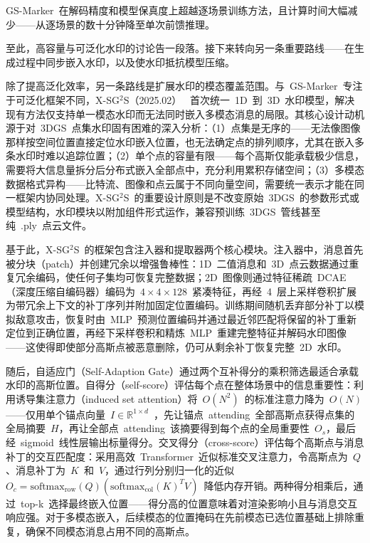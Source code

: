 GS-Marker~在解码精度和模型保真度上超越逐场景训练方法，且计算时间大幅减少——从逐场景的数十分钟降至单次前馈推理。

至此，高容量与可泛化水印的讨论告一段落。接下来转向另一条重要路线——在生成过程中同步嵌入水印，以及使水印抵抗模型压缩。

除了提高泛化效率，另一条路线是扩展水印的模态覆盖范围。与~GS-Marker~专注于可泛化框架不同，X-SG$^2$S（2025.02）~\cite{2502_10475} 首次统一~1D~到~3D~水印模型，解决现有方法仅支持单一模态水印而无法同时嵌入多模态消息的局限。其核心设计动机源于对~3DGS~点集水印固有困难的深入分析：（1）点集是无序的——无法像图像那样按空间位置直接定位水印嵌入位置，也无法确定点的排列顺序，尤其在嵌入多条水印时难以追踪位置；（2）单个点的容量有限——每个高斯仅能承载极少信息，需要将大信息量拆分后分布式嵌入全部点中，充分利用累积存储空间；（3）多模态数据格式异构——比特流、图像和点云属于不同向量空间，需要统一表示才能在同一框架内协同处理。X-SG$^2$S~的重要设计原则是不改变原始~3DGS~的参数形式或模型结构，水印模块以附加组件形式运作，兼容预训练~3DGS~管线甚至纯~.ply~点云文件。

基于此，X-SG$^2$S~的框架包含注入器和提取器两个核心模块。注入器中，消息首先被分块（patch）并创建冗余以增强鲁棒性：1D~二值消息和~3D~点云数据通过重复冗余编码，使任何子集均可恢复完整数据；2D~图像则通过特征稀疏~DCAE（深度压缩自编码器）编码为~$4 \times 4 \times 128$~紧凑特征，再经~4~层上采样卷积扩展为带冗余上下文的补丁序列并附加固定位置编码。训练期间随机丢弃部分补丁以模拟敌意攻击，恢复时由~MLP~预测位置编码并通过最近邻匹配将保留的补丁重新定位到正确位置，再经下采样卷积和精炼~MLP~重建完整特征并解码水印图像——这使得即使部分高斯点被恶意删除，仍可从剩余补丁恢复完整~2D~水印。

随后，自适应门（Self-Adaption Gate）通过两个互补得分的乘积筛选最适合承载水印的高斯位置。自得分（self-score）评估每个点在整体场景中的信息重要性：利用诱导集注意力（induced set attention）将~$O(N^2)$~的标准注意力降为~$O(N)$——仅用单个锚点向量~$I \in \mathbb{R}^{1 \times d}$~，先让锚点~attending~全部高斯点获得点集的全局摘要~$H$，再让全部点~attending~该摘要得到每个点的全局重要性~$O_s$，最后经~sigmoid~线性层输出标量得分。交叉得分（cross-score）评估每个高斯点与消息补丁的交互匹配度：采用高效~Transformer~近似标准交叉注意力，令高斯点为~$Q$、消息补丁为~$K$~和~$V$，通过行列分别归一化的近似~$O_c = \text{softmax}_\text{row}(Q)(\text{softmax}_\text{col}(K)^T V)$~降低内存开销。两种得分相乘后，通过~top-k~选择最终嵌入位置——得分高的位置意味着对渲染影响小且与消息交互响应强。对于多模态嵌入，后续模态的位置掩码在先前模态已选位置基础上排除重复，确保不同模态消息占用不同的高斯点。


